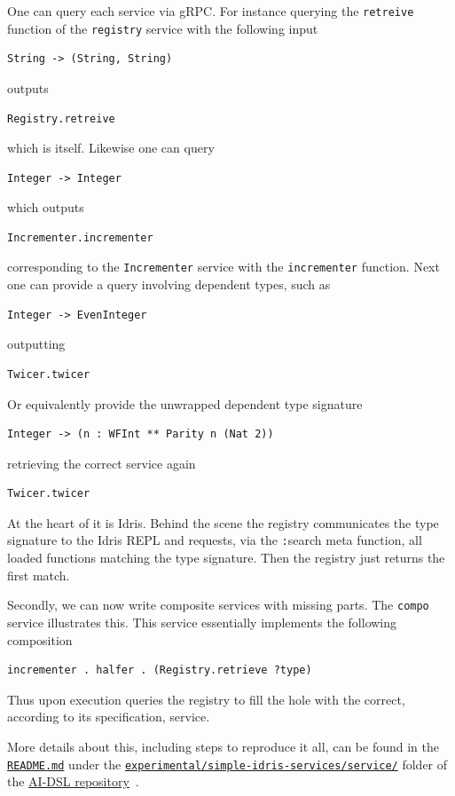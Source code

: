 \documentclass[]{report}
\begin{document}
One can query each service via gRPC.  For instance querying the
\texttt{retreive} function of the \texttt{registry} service with the
following input
\begin{verbatim}
String -> (String, String)
\end{verbatim}
outputs
\begin{verbatim}
Registry.retreive
\end{verbatim}
which is itself.  Likewise one can query
\begin{verbatim}
Integer -> Integer
\end{verbatim}
which outputs
\begin{verbatim}
Incrementer.incrementer
\end{verbatim}
corresponding to the \texttt{Incrementer} service with the
\texttt{incrementer} function.
Next one can provide a query involving dependent types, such as
\begin{verbatim}
Integer -> EvenInteger
\end{verbatim}
outputting
\begin{verbatim}
Twicer.twicer
\end{verbatim}
Or equivalently provide the unwrapped dependent type signature
\begin{verbatim}
Integer -> (n : WFInt ** Parity n (Nat 2))
\end{verbatim}
retrieving the correct service again
\begin{verbatim}
Twicer.twicer
\end{verbatim}

At the heart of it is Idris.  Behind the scene the registry
communicates the type signature to the Idris REPL and requests, via
the {\texttt :search} meta function, all loaded functions matching the
type signature.  Then the registry just returns the first match.

Secondly, we can now write composite services with missing parts.  The
\texttt{compo} service illustrates this.  This service essentially
implements the following composition
\begin{verbatim}
incrementer . halfer . (Registry.retrieve ?type)
\end{verbatim}
Thus upon execution queries the registry to fill the hole with the
correct, according to its specification, service.

More details about this, including steps to reproduce it all, can be
found in the
\href{https://github.com/singnet/ai-dsl/blob/master/experimental/registry-dsl/README.md}{\texttt{README.md}}
under the
\href{https://github.com/singnet/ai-dsl/blob/master/experimental/registry-dsl/}{\texttt{experimental/simple-idris-services/service/}}
folder of the \href{https://github.com/singnet/ai-dsl/}{AI-DSL
  repository}~\cite{AIDSLRepo}.
\end{document}
